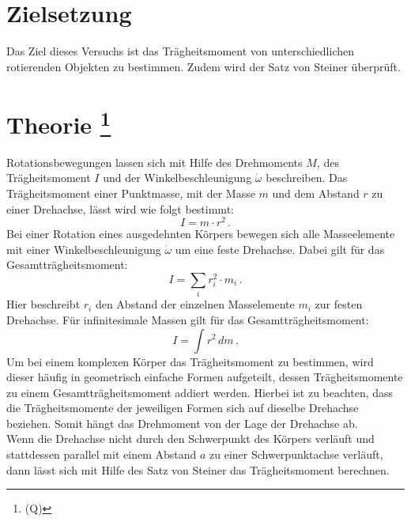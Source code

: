 \section{Zielsetzung}
\label{sec:Zielsetzung}
Das Ziel dieses Versuchs ist das Trägheitsmoment von unterschiedlichen rotierenden Objekten zu bestimmen. 
Zudem wird der Satz von Steiner überprüft.
%
\section{Theorie \footnote{(Q\cite{anleitungV101})}}
\label{sec:Theorie}
Rotationsbewegungen lassen sich mit Hilfe des Drehmoments $M$, des Trägheitsmoment $I$ und 
der Winkelbeschleunigung $\dot{\omega}$ beschreiben. Das Trägheitsmoment einer Punktmasse, 
mit der Masse $m$ und dem Abstand $r$ zu einer Drehachse, lässt wird wie folgt bestimmt:
\begin{equation}
    I = m \cdot r^{2}\,.
    \label{eqn:TragheitPunktmasse}
\end{equation}
%
Bei einer Rotation eines ausgedehnten Körpers bewegen sich alle Masseelemente mit einer 
Winkelbeschleunigung $\dot{\omega}$ um eine feste Drehachse. Dabei gilt für das Gesamtträgheitsmoment:
\begin{equation}
    I = \sum_{i} r_{i}^{2} \cdot m_{i}\, .
    \label{eqn:GesamttragheitSumme}
\end{equation}
%
Hier beschreibt $r_{i}$ den Abstand der einzelnen Masselemente $m_{i}$ zur festen Drehachse.
Für infinitesimale Massen gilt für das Gesamtträgheitsmoment:
\begin{equation}
    I = \int r^{2}\,dm \,.
    \label{eqn:GesamttragheitIntegral}
\end{equation}
%
Um bei einem komplexen Körper das Trägheitsmoment zu bestimmen, wird dieser häufig in 
geometrisch einfache Formen aufgeteilt, dessen Trägheitsmomente zu einem Gesamtträgheitsmoment 
addiert werden. Hierbei ist zu beachten, dass die Trägheitsmomente der jeweiligen Formen sich
auf dieselbe Drehachse beziehen. Somit hängt das Drehmoment von der Lage der Drehachse ab. \\
%
Wenn die Drehachse nicht durch den Schwerpunkt des Körpers verläuft und stattdessen parallel 
mit einem Abstand $a$ zu einer Schwerpunktachse verläuft, dann lässt sich mit Hilfe des Satz von Steiner
das Trägheitsmoment berechnen.
